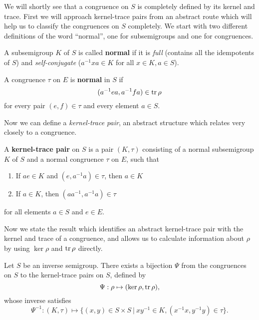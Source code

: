 We will shortly see that a congruence on $S$ is completely defined by its kernel
and trace.  First we will approach kernel-trace pairs from an abstract route
which will help us to classify the congruences on $S$ completely.  We start with
two different definitions of the word ``normal'', one for subsemigroups and one
for congruences.

\begin{definition}
  \label{def:kernel-normal}
  A subsemigroup $K$ of $S$ is called \textbf{normal} if it is
  \textit{full} (contains all the idempotents of $S$) and
  \textit{self-conjugate} ($a^{-1}xa \in K$ for all $x \in K, a \in S$).
  \cite[p.155]{howie}
\end{definition}

\begin{definition}
  \label{def:trace-normal}
  A congruence $\tau$ on $E$ is \textbf{normal} in $S$ if
  $$(a^{-1}ea,a^{-1}fa) \in \operatorname{tr} \rho$$
  for every pair $(e,f) \in \tau$ and every element $a \in S$.
\end{definition}

Now we can define a \textit{kernel-trace pair}, an abstract structure which
relates very closely to a congruence.

\begin{definition}
  \label{def:kernel-trace-pair}
  A \textbf{kernel-trace pair} on $S$ is a pair $(K,\tau)$ consisting of a
  normal subsemigroup $K$ of $S$ and a normal congruence $\tau$ on $E$, such
  that
  \begin{enumerate}
  \item If $ae \in K$ and $(e,a^{-1}a) \in \tau$, then $a \in K$
  \item If $a \in K$, then $(aa^{-1},a^{-1}a) \in \tau$
  \end{enumerate}
  for all elements $a \in S$ and $e \in E$.
  \cite[p.156]{howie}
\end{definition}

Now we state the result which identifies an abstract kernel-trace pair with the
kernel and trace of a congruence, and allows us to calculate information about
$\rho$ by using $\ker \rho$ and $\operatorname{tr} \rho$ directly.

\begin{theorem}
  \label{thm:kernel-trace-pair}

  Let $S$ be an inverse semigroup.  There exists a bijection $\Psi$ from the
  congruences on $S$ to the kernel-trace pairs on $S$, defined by
  $$\Psi: \rho \mapsto (\ker\rho, \operatorname{tr}\rho),$$
  whose inverse satisfies
  $$\Psi^{-1} : (K,\tau) \mapsto
  \{(x,y) \in S \times S ~|~ xy^{-1} \in K, (x^{-1}x, y^{-1}y) \in \tau\}.$$
\end{theorem}

